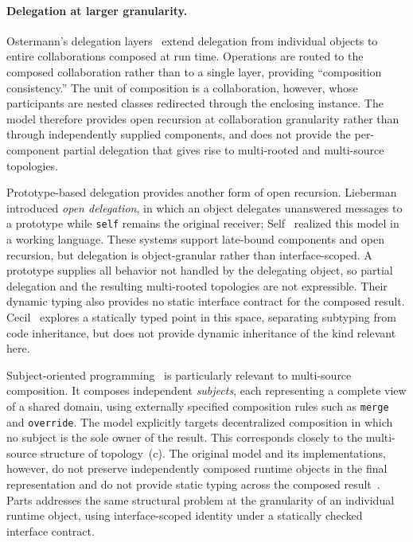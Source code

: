 \documentclass[acmsmall,nonacm]{acmart}
\theoremstyle{acmplain}
\newcommand{\code}[1]{\texttt{#1}}
\begin{document}
\paragraph{Delegation at larger granularity.}
Ostermann's delegation layers~\cite{ostermann2002} extend delegation from
individual objects to entire collaborations composed at run time. Operations
are routed to the composed collaboration rather than to a single layer,
providing ``composition consistency.'' The unit of composition is a
collaboration, however, whose participants are nested classes redirected
through the enclosing instance. The model therefore provides open recursion
at collaboration granularity rather than through independently supplied
components, and does not provide the per-component partial delegation that
gives rise to multi-rooted and multi-source topologies.

Prototype-based delegation provides another form of open recursion.
Lieberman~\cite{lieberman1986} introduced \emph{open delegation}, in which
an object delegates unanswered messages to a prototype while \code{self}
remains the original receiver; Self~\cite{self1987} realized this model in a
working language. These systems support late-bound components and open
recursion, but delegation is object-granular rather than interface-scoped.
A prototype supplies all behavior not handled by the delegating object, so
partial delegation and the resulting multi-rooted topologies are not
expressible. Their dynamic typing also provides no static interface contract
for the composed result. Cecil~\cite{chambers1993} explores a statically typed
point in this space, separating subtyping from code inheritance, but does not
provide dynamic inheritance of the kind relevant here.

Subject-oriented programming~\cite{harrison1993,ossher1995} is particularly
relevant to multi-source composition. It composes independent
\emph{subjects}, each representing a complete view of a shared domain, using
externally specified composition rules such as \code{merge} and
\code{override}. The model explicitly targets decentralized composition in
which no subject is the sole owner of the result. This corresponds closely to
the multi-source structure of topology~(c). The original model and its
implementations, however, do not preserve independently composed runtime
objects in the final representation and do not provide static typing across
the composed result~\cite{ossher1995}. Parts addresses the same structural
problem at the granularity of an individual runtime object, using
interface-scoped identity under a statically checked interface contract.
\end{document}
